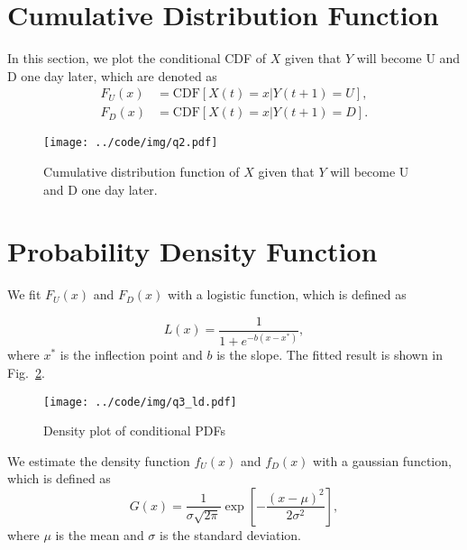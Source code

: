\documentclass[runningheads]{llncs}
\begin{document}
\section{Cumulative Distribution Function}\label{sec:2}
In this section, we plot the conditional CDF of $X$ given that $Y$ will become U and D one day later, which are denoted as
\begin{align}
    F_U(x) & = \text{CDF}[X(t)=x|Y(t+1)=U], \\
    F_D(x) & = \text{CDF}[X(t)=x|Y(t+1)=D].
\end{align}



\begin{figure}[!htb]
    \begin{center}
        \texttt{[image: ../code/img/q2.pdf]}
    \end{center}
    \caption{ Cumulative distribution function of $X$ given that $Y$ will become U and D one day later.}
    \label{fig:q2}
\end{figure}


\section{Probability Density Function}\label{sec:3}

We fit $F_U(x)$ and $F_D(x)$ with a logistic function, which is defined as

\begin{equation}
    L(x)=\frac{1}{1+e^{-b(x-x^*)}},
\end{equation}
where $x^*$ is the inflection point and $b$ is the slope. The fitted result is shown in Fig.~\ref{fig:q3ld}.

\begin{figure}
    \begin{center}
        \texttt{[image: ../code/img/q3\_ld.pdf]}
    \end{center}
    \caption{Density plot of conditional PDFs}
    \label{fig:q3ld}
\end{figure}

We estimate the density function $f_U(x)$ and $f_D(x)$ with a gaussian function, which is defined as
\begin{equation}
    G(x)=\frac{1}{\sigma \sqrt{2 \pi}} \exp \left[-\frac{(x-\mu)^{2}}{2 \sigma^{2}}\right],
\end{equation}
where $\mu$ is the mean and $\sigma$ is the standard deviation.
\end{document}

